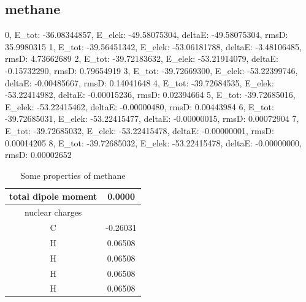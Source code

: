 \subsection{methane}
\label{subsec:methane}
 
\begin{python}[caption={iterations for methane},label={ls:Listing 8},basicstyle=\scriptsize]
0, E_tot: -36.08344857, E_elek: -49.58075304, deltaE: -49.58075304, rmsD:  35.9980315
1, E_tot: -39.56451342, E_elek: -53.06181788, deltaE: -3.48106485, rmsD:  4.73662689
2, E_tot: -39.72183632, E_elek: -53.21914079, deltaE: -0.15732290, rmsD:  0.79654919
3, E_tot: -39.72669300, E_elek: -53.22399746, deltaE: -0.00485667, rmsD:  0.14041648
4, E_tot: -39.72684535, E_elek: -53.22414982, deltaE: -0.00015236, rmsD:  0.02394664
5, E_tot: -39.72685016, E_elek: -53.22415462, deltaE: -0.00000480, rmsD:  0.00443984
6, E_tot: -39.72685031, E_elek: -53.22415477, deltaE: -0.00000015, rmsD:  0.00072904
7, E_tot: -39.72685032, E_elek: -53.22415478, deltaE: -0.00000001, rmsD:  0.00014205
8, E_tot: -39.72685032, E_elek: -53.22415478, deltaE: -0.00000000, rmsD:  0.00002652
\end{python}
 
 \begin{table}[ht]
    \centering
    \begin{tabular}{c|c}
         total dipole moment & 0.0000  \\
         \hline
         nuclear charges &  \\ 
         \hline
         C & -0.26031 \\
         H & 0.06508 \\
         H & 0.06508 \\
         H & 0.06508\\
         H & 0.06508 \\
    \end{tabular}
    \caption{Some properties of methane}
    \label{tab:number2}
\end{table}
